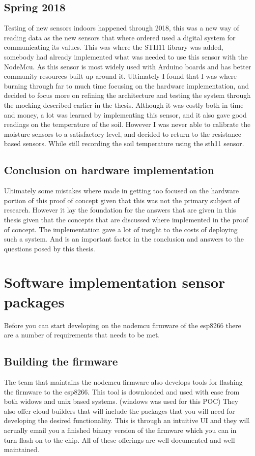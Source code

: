 \documentclass[]{uiophd}
\begin{document}
\subsection{Spring 2018}
Testing of new sensors indoors happened through 2018, this was a new way of reading data as the new sensors that where ordered used a digital system for communicating its values. This was where the STH11 library was added, somebody had already implemented what was needed to use this sensor with the NodeMcu. As this sensor is most widely used with Arduino boards and has better community resources built up around it. Ultimately I found that I was where burning through far to much time focusing on the hardware implementation, and decided to focus more on refining the architecture and testing the system through the mocking described earlier in the thesis. Although it was costly both in time and money, a lot was learned by implementing this sensor, and it also gave good readings on the temperature of the soil. However I was never able to calibrate the moisture sensors to a satisfactory level, and decided to return to the resistance based sensors. While still recording the soil temperature using the sth11 sensor. 
\subsection{Conclusion on hardware implementation}
Ultimately some mistakes where made in getting too focused on the hardware portion of this proof of concept given that this was not the primary subject of research. However it lay the foundation for the answers that are given in this thesis given that the concepts that are discussed where implemented in the proof of concept. The implementation gave a lot of insight to the costs of deploying such a system. And is an important factor in the conclusion and answers to the questions posed by this thesis.
\section{Software implementation sensor packages}
Before you can start developing on the nodemcu firmware of the esp8266 there are a number of requirements that needs to be met.
\subsection{Building the firmware}
The team that maintains the nodemcu firmware also develops tools for flashing the firmware to the esp8266. This tool is downloaded and used with ease from both widows and unix based systems. (windows was used for this POC) They also offer cloud builders that will include the packages that you will need for developing the desired functionality. This is through an intuitive UI and they will acrually email you a finished binary version of the firmware which you can in turn flash on to the chip. All of these offerings are well documented and well maintained.
\end{document}
